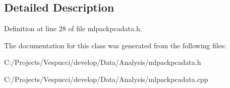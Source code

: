 \subsection{Detailed Description}


Definition at line 28 of file mlpackpcadata.\+h.



The documentation for this class was generated from the following files\+:\begin{DoxyCompactItemize}
\item 
C\+:/\+Projects/\+Vespucci/develop/\+Data/\+Analysis/mlpackpcadata.\+h\item 
C\+:/\+Projects/\+Vespucci/develop/\+Data/\+Analysis/mlpackpcadata.\+cpp\end{DoxyCompactItemize}
